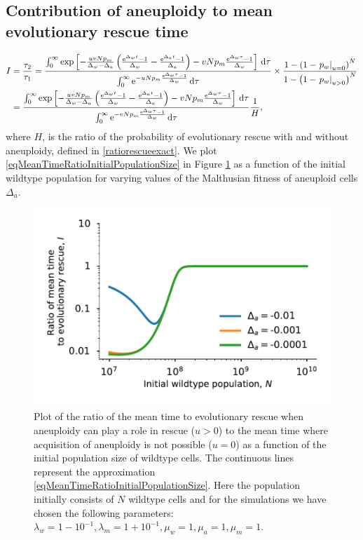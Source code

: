 \documentclass[12pt]{extarticle}
\renewcommand{\d}{{\rm d}}
\newcommand{\e}{{\rm e}}
\begin{document}
\subsection*{Contribution of aneuploidy to mean evolutionary rescue time}
\begin{align}\nonumber
I&=\frac{\tau_2}{\tau_1}=\frac{\int_0^\infty\exp\left[-\frac{uvNp_m}{\Delta_w-\Delta_a}\left(\frac{\e^{\Delta_wt}-1}{\Delta_w}-\frac{\e^{\Delta_at}-1}{\Delta_a}\right)-vNp_m\frac{\e^{\Delta_w\tau}-1}{\Delta_w}\right]\,\d\tau}{\int_0^\infty\e^{-uNp_m\frac{\e^{\Delta_w\tau}-1}{\Delta_w}}\,\d\tau}\times\frac{1-\left(1-\left.p_w\right|_{u=0}\right)^N}{1-\left(1-\left.p_w\right|_{u>0}\right)^N}\\\label{eqMeanTimeRatioInitialPopulationSize}
&=\frac{\int_0^\infty\exp\left[-\frac{uvNp_m}{\Delta_w-\Delta_a}\left(\frac{\e^{\Delta_wt}-1}{\Delta_w}-\frac{\e^{\Delta_at}-1}{\Delta_a}\right)-vNp_m\frac{\e^{\Delta_w\tau}-1}{\Delta_w}\right]\,\d\tau}{\int_0^\infty\e^{-vNp_m\frac{\e^{\Delta_w\tau}-1}{\Delta_w}}\,\d\tau}\frac{1}{H},
\end{align}
where $H$, is the ratio of the probability of evolutionary rescue with and without aneuploidy, defined in \eqref{ratiorescueexact}. We plot \eqref{eqMeanTimeRatioInitialPopulationSize} in Figure \ref{MeanTimeRatioInitialPopulationSize} as a function of the initial wildtype population for varying values of the Malthusian fitness of aneuploid cells $\Delta_a$.

\begin{figure}[!t]
 \vspace*{1\baselineskip}
\includegraphics[width=1\textwidth]{Figures/MeanTimeRatioInitialPopulationSize.pdf}
\caption{Plot of the ratio of the mean time to evolutionary rescue when aneuploidy can play a role in rescue ($u>0$) to the mean time where acquisition of aneuploidy is not possible ($u=0$) as a function of the initial population size of wildtype cells. The continuous lines represent the approximation \eqref{eqMeanTimeRatioInitialPopulationSize}.  Here the population initially consists of $N$ wildtype cells and for the simulations we have chosen the following parameters: $\lambda_w=1-10^{-1},\lambda_m=1+10^{-1},\mu_w=1,\mu_a=1,\mu_m=1$.}
\label{MeanTimeRatioInitialPopulationSize}
\end{figure}
\end{document}
